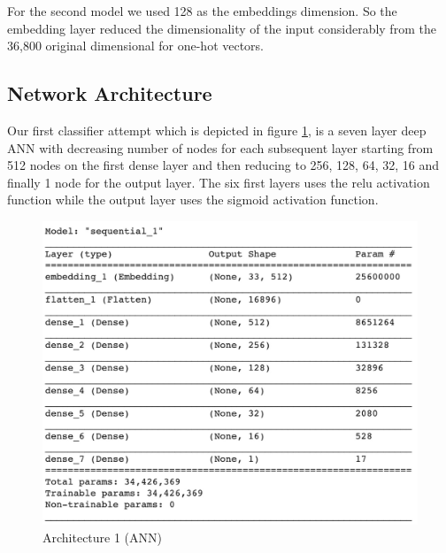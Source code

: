 \documentclass[conference]{sig-alternate-05-2015}
\begin{document}
For the second model we used 128 as the embeddings dimension. So the  embedding layer reduced the dimensionality of the input considerably from the 36,800 original dimensional for one-hot vectors.

\subsection{Network Architecture}
Our first classifier attempt which is depicted in figure \ref{fig:model ANN}, is a seven layer deep ANN with decreasing number of nodes for each subsequent layer starting from 512 nodes on the first dense layer and then reducing to 256, 128, 64, 32, 16 and finally 1 node for the output layer. The six first layers uses the relu activation function while the output layer uses the sigmoid activation function.

\begin{figure}
	\centering
	\includegraphics[width=0.8\linewidth]{"model ANN"}
	\caption{Architecture 1 (ANN)}
	\label{fig:model ANN}
\end{figure}
\end{document}
